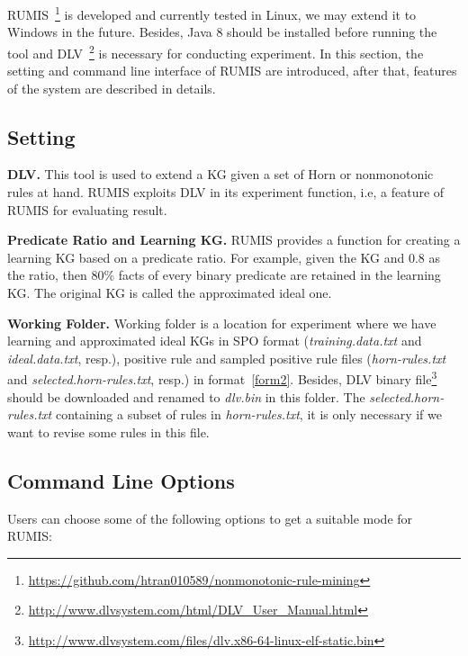 RUMIS~\footnote{\url{https://github.com/htran010589/nonmonotonic-rule-mining}} is developed and currently tested in Linux, we may extend it to Windows in the future. Besides, Java 8 should be installed before running the tool and DLV~\footnote{\url{http://www.dlvsystem.com/html/DLV_User_Manual.html}} is necessary for conducting experiment. In this section, the setting and command line interface of RUMIS are introduced, after that, features of the system are described in details.

\subsection{Setting}

\textbf{DLV.} This tool is used to extend a KG given a set of Horn or nonmonotonic rules at hand. RUMIS exploits DLV in its experiment function, i.e, a feature of RUMIS for evaluating result.

\textbf{Predicate Ratio and Learning KG.} RUMIS provides a function for creating a learning KG based on a predicate ratio. For example, given the KG and 0.8 as the ratio, then 80\% facts of every binary predicate are retained in the learning KG. The original KG is called the approximated ideal one.

\textbf{Working Folder.} Working folder is a location for experiment where we have learning and approximated ideal KGs in SPO format (\textit{training.data.txt} and \textit{ideal.data.txt}, resp.), positive rule and sampled positive rule files (\textit{horn-rules.txt} and \textit{selected.horn-rules.txt}, resp.) in format~\ref{form2}. Besides, DLV binary file\footnote{\url{http://www.dlvsystem.com/files/dlv.x86-64-linux-elf-static.bin}} should be downloaded and renamed to \textit{dlv.bin} in this folder. The \textit{selected.horn-rules.txt} containing a subset of rules in \textit{horn-rules.txt}, it is only necessary if we want to revise some rules in this file.

\subsection{Command Line Options}

Users can choose some of the following options to get a suitable mode for RUMIS:

